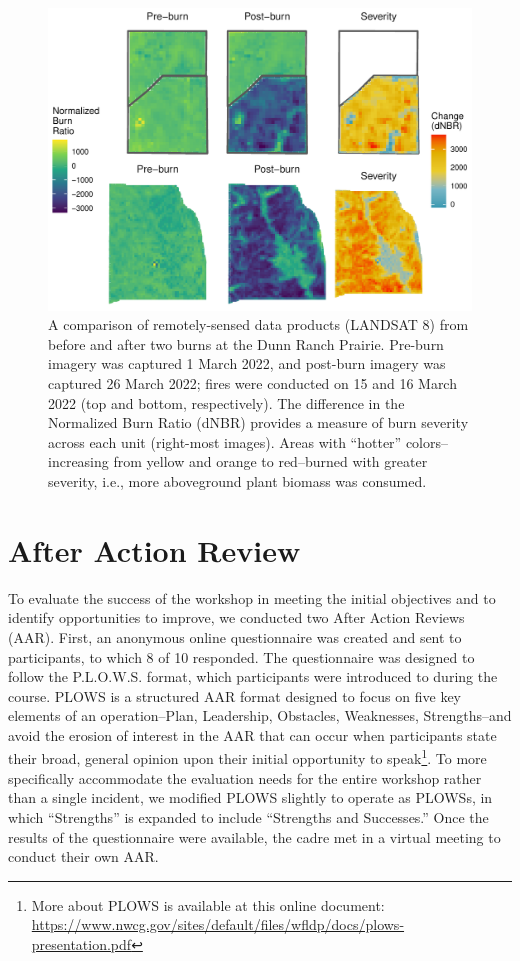\documentclass[fire,article,submit,moreauthors,pdftex]{Definitions/mdpi}
\begin{document}
\begin{figure}
\centering
\includegraphics[width=1\columnwidth]{severity_gg-1.pdf}
\caption{A comparison of remotely-sensed data products (LANDSAT 8) from before and after two burns at the Dunn Ranch Prairie. Pre-burn imagery was captured 1 March 2022, and post-burn imagery was captured 26 March 2022; fires were conducted on 15 and 16 March 2022 (top and bottom, respectively). The difference in the Normalized Burn Ratio (dNBR) provides a measure of burn severity across each unit (right-most images). Areas with ``hotter'' colors--increasing from yellow and orange to red--burned with greater severity, i.e., more aboveground plant biomass was consumed. \label{severity}}
\end{figure}

\section{After Action Review}

To evaluate the success of the workshop in meeting the initial objectives and to identify opportunities to improve, we conducted two After Action Reviews (AAR).
First, an anonymous online questionnaire was created and sent to participants, to which 8 of 10 responded.
The questionnaire was designed to follow the P.L.O.W.S. format, which participants were introduced to during the course.
PLOWS is a structured AAR format designed to focus on five key elements of an operation--Plan, Leadership, Obstacles, Weaknesses, Strengths--and avoid the erosion of interest in the AAR that can occur when participants state their broad, general opinion upon their initial opportunity to speak\footnote{More about PLOWS is available at this online document: \url{https://www.nwcg.gov/sites/default/files/wfldp/docs/plows-presentation.pdf}}.
To more specifically accommodate the evaluation needs for the entire workshop rather than a single incident, we modified PLOWS slightly to operate as PLOWSs, in which ``Strengths'' is expanded to include ``Strengths and Successes.''
Once the results of the questionnaire were available, the cadre met in a virtual meeting to conduct their own AAR.
\end{document}
